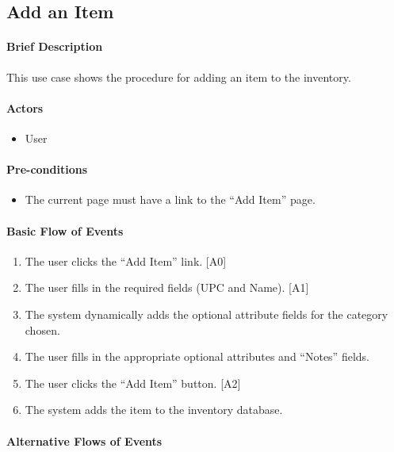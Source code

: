 \documentclass{article}
\begin{document}
\subsection{Add an Item}

\paragraph{Brief Description}
This use case shows the procedure for adding an item to the inventory.

\paragraph{Actors}
\begin{itemize}
\item User
\end{itemize}

\paragraph{Pre-conditions}
\begin{itemize}
\item The current page must have a link to the ``Add Item'' page.
\end{itemize}

\paragraph{Basic Flow of Events}
\begin{enumerate}
\item The user clicks the ``Add Item'' link. [A0]
\item The user fills in the required fields (UPC and Name). [A1]
\item The system dynamically adds the optional attribute fields for the category chosen.
\item The user fills in the appropriate optional attributes and ``Notes'' fields.
\item The user clicks the ``Add Item'' button. [A2]
\item The system adds the item to the inventory database.
\end{enumerate}

\paragraph{Alternative Flows of Events}
\end{document}
